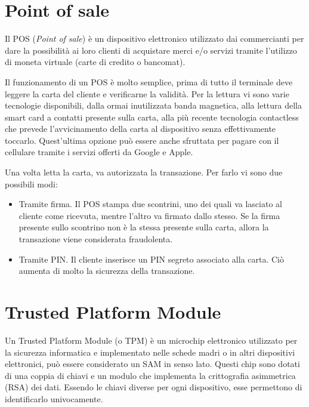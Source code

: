 \section{Point of sale}
Il POS (\textit{Point of sale}) è un dispositivo elettronico utilizzato dai commercianti per dare la possibilità ai loro clienti di acquistare merci e/o servizi tramite l'utilizzo di moneta virtuale (carte di credito o bancomat).

Il funzionamento di un POS è molto semplice, prima di tutto il terminale deve leggere la carta del cliente e verificarne la validità. Per la lettura vi sono varie tecnologie disponibili, dalla ormai inutilizzata banda magnetica, alla lettura della smart card a contatti presente sulla carta, alla più recente tecnologia contactless che prevede l'avvicinamento della carta al dispositivo senza effettivamente toccarlo. Quest'ultima opzione può essere anche sfruttata per pagare con il cellulare tramite i servizi offerti da Google e Apple.

Una volta letta la carta, va autorizzata la transazione. Per farlo vi sono due possibili modi:
\begin{itemize}
    \item Tramite firma. Il POS stampa due scontrini, uno dei quali va lasciato al cliente come ricevuta, mentre l'altro va firmato dallo stesso. Se la firma presente sullo scontrino non è la stessa presente sulla carta, allora la transazione viene considerata fraudolenta.
    \item Tramite PIN. Il cliente inserisce un PIN segreto associato alla carta. Ciò aumenta di molto la sicurezza della transazione.
\end{itemize}

\cite{pos}

\section{Trusted Platform Module}
\label{trusted_platform_module}
Un Trusted Platform Module (o TPM) è un microchip elettronico utilizzato per la sicurezza informatica e implementato nelle schede madri o in altri dispositivi elettronici, può essere considerato un SAM in senso lato. Questi chip sono dotati di una coppia di chiavi e un modulo che implementa la crittografia asimmetrica (RSA) dei dati. Essendo le chiavi diverse per ogni dispositivo, esse permettono di identificarlo univocamente.

